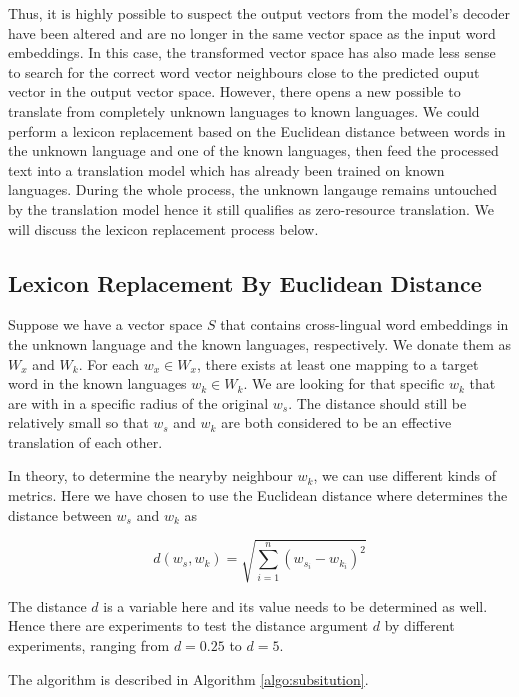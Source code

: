 \documentclass[thesis,fonts=libertine]{cluu}
\begin{document}
Thus, it is highly possible to suspect the output vectors from the model's decoder have been altered and are no longer in the same vector space as the input word embeddings. In this case, the transformed vector space has also made less sense to search for the correct word vector neighbours close to the predicted ouput vector in the output vector space. However, there opens a new possible to translate from completely unknown languages to known languages. We could perform a lexicon replacement based on the Euclidean distance between words in the unknown language and one of the known languages, then feed the processed text into a translation model which has already been trained on known languages. During the whole process, the unknown langauge remains untouched by the translation model hence it still qualifies as zero-resource translation. We will discuss the lexicon replacement process below.

\subsection{Lexicon Replacement By Euclidean Distance}

Suppose we have a vector space $S$ that contains cross-lingual word embeddings in the unknown language and the known languages, respectively. We donate them as $W_x$ and $W_k$. For each $w_x\in W_x$, there exists at least one mapping to a target word in the known languages $w_k \in W_k$. We are looking for that specific $w_k$ that are with in a specific radius of the original $w_s$. The distance should still be relatively small so that $w_s$ and $w_k$ are both considered to be an effective translation of each other.

In theory, to determine the nearyby neighbour $w_k$, we can use different kinds of metrics. Here we have chosen to use the Euclidean distance where determines the distance between $w_s$ and $w_k$ as

\begin{equation}
  d(w_s, w_k)=\sqrt{\sum_{i=1}^n{(w_{s_i}-w_{k_i})}^2}
\end{equation}

The distance $d$ is a variable here and its value needs to be determined as well. Hence there are experiments to test the distance argument $d$ by different experiments, ranging from $d=0.25$ to $d=5$.

The algorithm is described in Algorithm \ref{algo:subsitution}.
\end{document}
